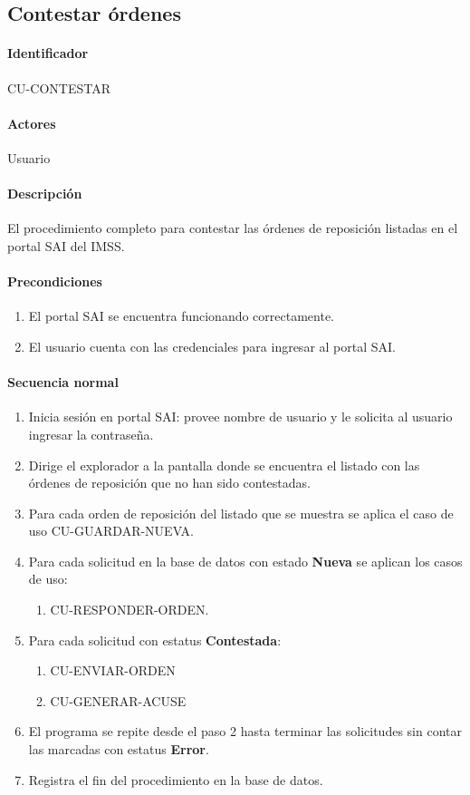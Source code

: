 \subsection{Contestar órdenes}
\paragraph{Identificador}
CU-CONTESTAR
\paragraph{Actores}
Usuario
\paragraph{Descripción}
El procedimiento completo para contestar las órdenes de reposición listadas en el portal SAI del IMSS.
\paragraph{Precondiciones}
\begin{enumerate}
  \item El portal SAI se encuentra funcionando correctamente.
  \item El usuario cuenta con las credenciales para ingresar al portal SAI.
\end{enumerate}
\paragraph{Secuencia normal}
\begin{enumerate}
  \item Inicia sesión en portal SAI: provee nombre de usuario y le solicita al usuario ingresar la contraseña.
  \item Dirige el explorador a la pantalla donde se encuentra el listado con las órdenes de reposición que no han sido contestadas.
  \item Para cada orden de reposición del listado que se muestra se aplica el caso de uso CU-GUARDAR-NUEVA.
  \item Para cada solicitud en la base de datos con estado \textbf{Nueva} se aplican los casos de uso:
  \begin{enumerate}
    \item CU-RESPONDER-ORDEN.
  \end{enumerate}
  \item Para cada solicitud con estatus \textbf{Contestada}:
  \begin{enumerate}
    \item CU-ENVIAR-ORDEN
    \item CU-GENERAR-ACUSE
  \end{enumerate}
  \item El programa se repite desde el paso 2 hasta terminar las solicitudes sin contar las marcadas con estatus \textbf{Error}.
  \item Registra el fin del procedimiento en la base de datos.
\end{enumerate}
